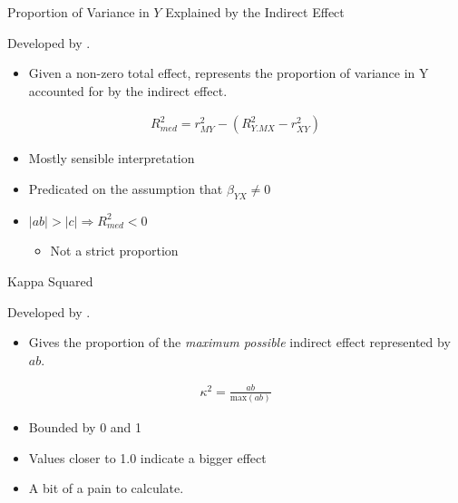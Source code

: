 \documentclass{beamer}
\begin{document}
\begin{frame}{Proportion of Variance in $Y$ Explained by the Indirect Effect}
  
  Developed by \citet{fairchildEtAl:2009}.
  \begin{itemize}
    \item Given a non-zero total effect, represents the proportion of
      variance in Y accounted for by the indirect effect.
  \end{itemize}
  
  \begin{align*}
    R_{med}^2 = r_{MY}^2 - \left( R_{Y.MX}^2-r_{XY}^2 \right)
  \end{align*}

  \begin{itemize}
  \item Mostly sensible interpretation
  \item Predicated on the assumption that $\beta_{YX} \neq 0$
  \item $|ab| > |c| \Rightarrow R_{med}^2 < 0$
    \begin{itemize}
    \item Not a strict proportion
    \end{itemize}
  \end{itemize}
  
\end{frame}


\begin{frame}{Kappa Squared}
  
  Developed by \citet{preacherKelley:2011}.
  \begin{itemize}
  \item Gives the proportion of the \emph{maximum possible} indirect
    effect represented by $ab$.
  \end{itemize}
  
  \begin{align*}
    \kappa^2 = \frac{ab}{\text{max}(ab)}
  \end{align*}
  
  \begin{itemize}
  \item Bounded by 0 and 1
  \item Values closer to 1.0 indicate a bigger effect
  \item A bit of a pain to calculate.
  \end{itemize}
  
\end{frame}
\end{document}
